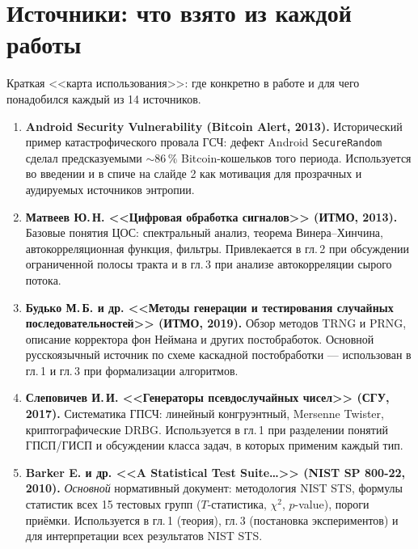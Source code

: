 \documentclass[12pt,a4paper]{extarticle}
\begin{document}
\section*{Источники: что взято из каждой работы}

Краткая <<карта использования>>: где конкретно в работе и для чего
понадобился каждый из 14 источников.

\begin{enumerate}
  \setlength{\itemsep}{0.4em}

  \item \textbf{Android Security Vulnerability (Bitcoin Alert, 2013).}
    Исторический пример катастрофического провала ГСЧ: дефект Android
    \texttt{SecureRandom} сделал предсказуемыми $\sim\!86\,\%$ Bitcoin-кошельков
    того периода. Используется во введении и в спиче на слайде 2 как
    мотивация для прозрачных и аудируемых источников энтропии.

  \item \textbf{Матвеев Ю.\,Н. <<Цифровая обработка сигналов>> (ИТМО, 2013).}
    Базовые понятия ЦОС: спектральный анализ, теорема Винера--Хинчина,
    автокорреляционная функция, фильтры. Привлекается в гл.\,2 при
    обсуждении ограниченной полосы тракта и в гл.\,3 при анализе
    автокорреляции сырого потока.

  \item \textbf{Будько М.\,Б. и др. <<Методы генерации и тестирования
    случайных последовательностей>> (ИТМО, 2019).} Обзор методов TRNG и
    PRNG, описание корректора фон Неймана и других постобработок. Основной
    русскоязычный источник по схеме каскадной постобработки --- использован
    в гл.\,1 и гл.\,3 при формализации алгоритмов.

  \item \textbf{Слеповичев И.\,И. <<Генераторы псевдослучайных чисел>>
    (СГУ, 2017).} Систематика ГПСЧ: линейный конгруэнтный, Mersenne
    Twister, криптографические DRBG. Используется в гл.\,1 при разделении
    понятий ГПСП/ГИСП и обсуждении класса задач, в которых применим
    каждый тип.

  \item \textbf{Barker E. и др. <<A Statistical Test Suite\ldots>>
    (NIST SP 800-22, 2010).} \emph{Основной} нормативный документ:
    методология NIST STS, формулы статистик всех 15 тестовых групп
    ($T$-статистика, $\chi^2$, $p$-value), пороги приёмки. Используется
    в гл.\,1 (теория), гл.\,3 (постановка экспериментов) и для интерпретации
    всех результатов NIST STS.


\end{enumerate}
\end{document}

